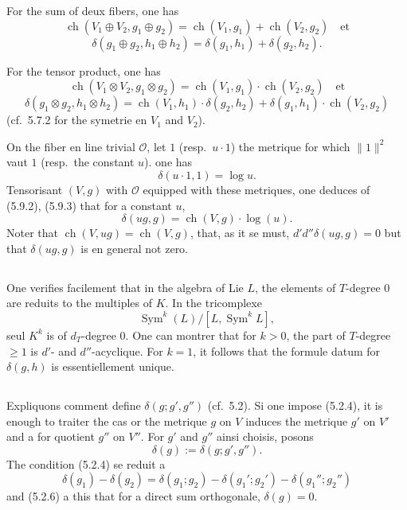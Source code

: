 \documentclass[12pt,a4paper]{article}
\theoremstyle{plain}
\theoremstyle{definition}
\DeclareMathOperator{\ch}{ch}
\DeclareMathOperator{\Sym}{Sym}
\newcommand{\Oo}{\mathscr{O}}
\begin{document}
For the sum of deux fibers, one has
\[
\ch(V_1 \oplus V_2, g_1 \oplus g_2) = \ch(V_1, g_1) + \ch(V_2, g_2) \quad \text{et}
\]
\begin{equation}\label{eq:5.9.1}
\delta(g_1 \oplus g_2, h_1 \oplus h_2) = \delta(g_1, h_1) + \delta(g_2, h_2) .
\end{equation}

For the tensor product, one has
\begin{equation}\label{eq:5.9.2}
\ch(V_1 \otimes V_2, g_1 \otimes g_2) = \ch(V_1, g_1) \cdot \ch(V_2, g_2) \quad \text{et}
\end{equation}
\[
\delta(g_1 \otimes g_2, h_1 \otimes h_2) = \ch(V_1, h_1) \cdot \delta(g_2, h_2) + \delta(g_1, h_1) \cdot \ch(V_2, g_2)
\]
(cf.~5.7.2 for the symetrie en $V_1$ and $V_2$).

On the fiber en line trivial $\Oo$, let $1$ (resp.\ $u \cdot 1$) the metrique for which
$\|1\|^2$ vaut $1$ (resp.\ the constant $u$). one has
\begin{equation}\label{eq:5.9.3}
\delta(u \cdot 1, 1) = \log u .
\end{equation}
Tensorisant $(V, g)$ with $\Oo$ equipped with these metriques, one deduces of (5.9.2), (5.9.3)
that for a constant $u$,
\begin{equation}\label{eq:5.9.4}
\delta(ug, g) = \ch(V, g) \cdot \log(u) .
\end{equation}
Noter that $\ch(V, ug) = \ch(V, g)$, that, as it se must, $d'd''\delta(ug, g) = 0$ but that
$\delta(ug, g)$ is en general not zero.

\subsection{}

One verifies facilement that in the algebra of Lie $L$, the elements
of $T$-degree $0$ are reduits to the multiples of $K$. In the tricomplexe
\[
\Sym^k(L)/[L, \Sym^k L] ,
\]
seul $K^k$ is of $d_T$-degree $0$. One can montrer that for $k > 0$, the part
of $T$-degree $\geq 1$ is $d'$- and $d''$-acyclique. For $k = 1$, it follows that the
formule datum for $\delta(g, h)$ is essentiellement unique.

\subsection{}

Expliquons comment define $\delta(g; g', g'')$ (cf.~5.2). Si one impose (5.2.4),
it is enough to traiter the cas or the metrique $g$ on $V$ induces the metrique $g'$
on $V'$ and a for quotient $g''$ on $V''$. For $g'$ and $g''$ ainsi choisis, posons
\[
\delta(g) := \delta(g; g', g'') .
\]
The condition (5.2.4) se reduit a
\[
\delta(g_1) - \delta(g_2) = \delta(g_1; g_2) - \delta(g_1'; g_2') - \delta(g_1''; g_2'')
\]
and (5.2.6) a this that for a direct sum orthogonale, $\delta(g) = 0$.
\end{document}

